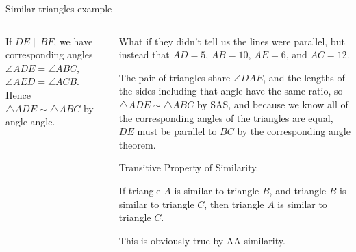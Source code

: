 \documentclass[9pt,aspectratio=169]{beamer}
\begin{document}
\begin{frame}{Similar triangles example}
\begin{columns}[T]
\begin{column}{0.5\textwidth}
\begin{columns}[t, totalwidth=\textwidth]
\begin{column}{0.6\linewidth}
        \end{column}
      \end{columns}
      If $DE \parallel BF$, we have corresponding angles $\angle ADE = \angle ABC$, $\angle AED = \angle ACB$.  Hence $\triangle ADE \sim \triangle ABC$ by angle-angle.
    \end{column}
    \begin{column}{0.5\textwidth}
      \begin{problem}
        What if they didn’t tell us the lines were parallel, but instead that $AD = 5$, $AB = 10$, $AE = 6$, and $AC = 12$.  
      \end{problem}
      The pair of triangles share $\angle DAE$, and the lengths of the sides including that angle have the same ratio, so $\triangle ADE \sim \triangle ABC$ by SAS, and because we know all of the corresponding angles of the triangles are equal, $DE$ must be parallel to $BC$ by the corresponding angle theorem.

      \begin{definition}
        Transitive Property of Similarity.  
        
        If triangle $A$ is similar to triangle $B$, and triangle $B$ is similar to triangle $C$, then triangle $A$ is similar to triangle $C$.
      \end{definition}

      This is obviously true by AA similarity.
    \end{column}
  \end{columns}
\end{frame}
\end{document}
